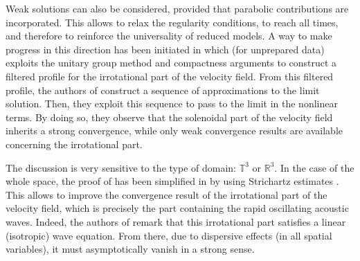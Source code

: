 \documentclass[11pt,reqno]{amsart}
\def \R{{\mathbb{R}}}
\def \T{{\mathbb{T}}}
\begin{document}
Weak solutions can also be considered, provided that parabolic contributions are incorporated. This allows to relax the regularity conditions, to reach all times, and therefore to reinforce the universality of reduced models. A way to make progress in this direction has been initiated in \cite{LM98} which (for unprepared data) exploits the unitary group method \cite{Gre97,Sch94} and compactness arguments to construct a filtered profile for the irrotational part  of the velocity field. From this filtered profile, the authors of \cite{LM98} construct a sequence of approximations to the limit solution. Then, they exploit this sequence to pass to the limit in the nonlinear terms. By doing so, they observe that  the solenoidal part of the velocity field inherits a strong convergence, while only weak convergence results are available concerning the irrotational part.

The discussion is very sensitive to the type of domain: $\T^3 $ or $\R^3$. In the case of the whole space, the proof of \cite{LM98} has been  simplified in \cite{DG99} by using Strichartz estimates \cite{GV95, KT98}. This allows to improve the convergence result of the irrotational part of the velocity field, which is precisely the part containing the rapid oscillating acoustic waves.  Indeed, the authors of \cite{DG99} remark that this  irrotational part satisfies a  linear (isotropic) wave equation. From there, due to dispersive effects (in all spatial variables), it must asymptotically vanish in a strong sense.

\end{document}
